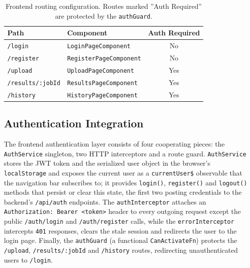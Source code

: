 \begin{table}[htbp]
    \centering
    \footnotesize
    \begin{tabular}{|l|l|c|}
        \hline
        \textbf{Path}            & \textbf{Component}             & \textbf{Auth Required} \\
        \hline\hline
        \texttt{/login}          & \texttt{LoginPageComponent}    & No                     \\
        \hline
        \texttt{/register}       & \texttt{RegisterPageComponent} & No                     \\
        \hline
        \texttt{/upload}         & \texttt{UploadPageComponent}   & Yes                    \\
        \hline
        \texttt{/results/:jobId} & \texttt{ResultsPageComponent}  & Yes                    \\
        \hline
        \texttt{/history}        & \texttt{HistoryPageComponent}  & Yes                    \\
        \hline
    \end{tabular}
    \caption{Frontend routing configuration. Routes marked ''Auth Required'' are protected by the \texttt{authGuard}.}
    \label{tab:frontend-routes}
\end{table}

\subsection{Authentication Integration}
\label{subsec:frontend-auth}

 \par The frontend authentication layer consists of four cooperating pieces: the \texttt{AuthService} singleton, two HTTP interceptors and a route guard. \texttt{AuthService} stores the JWT token and the serialized user object in the browser's \texttt{localStorage} and exposes the current user as a \texttt{currentUser\$} observable that the navigation bar subscribes to; it provides \texttt{login()}, \texttt{register()} and \texttt{logout()} methods that persist or clear this state, the first two posting credentials to the backend's \texttt{/api/auth} endpoints. The \texttt{authInterceptor} attaches an \texttt{Authorization: Bearer <token>} header to every outgoing request except the public \texttt{/auth/login} and \texttt{/auth/register} calls, while the \texttt{errorInterceptor} intercepts \texttt{401} responses, clears the stale session and redirects the user to the login page. Finally, the \texttt{authGuard} (a functional \texttt{CanActivateFn}) protects the \texttt{/upload}, \texttt{/results/:jobId} and \texttt{/history} routes, redirecting unauthenticated users to \texttt{/login}.

